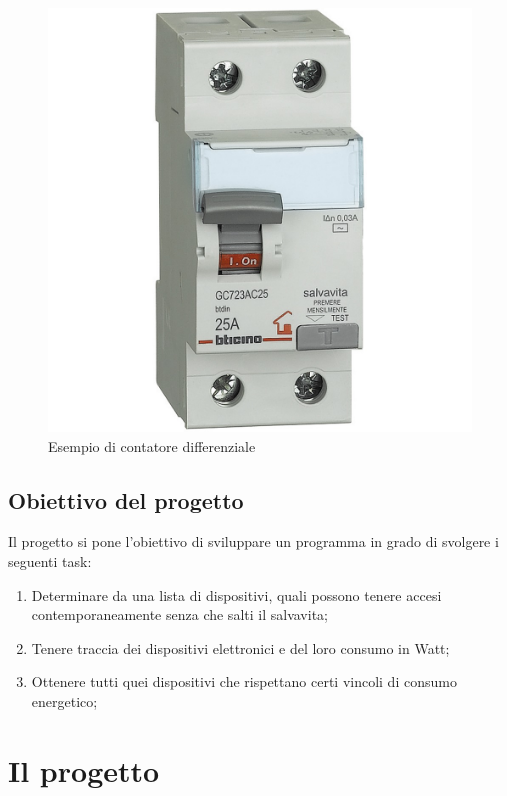 \documentclass[12pt, letterpaper]{article}
\begin{document}
\begin{figure}[h]
      \centering
      \includegraphics[scale=0.2]{interruttore-diff.jpg}
      \caption{Esempio di contatore differenziale}
\end{figure}


\subsection{Obiettivo del progetto}

Il progetto si pone l'obiettivo di sviluppare un programma in grado di svolgere
i seguenti task:

\begin{enumerate}
      \item Determinare da una lista di dispositivi, quali possono tenere accesi contemporaneamente
            senza che salti il salvavita;
      \item Tenere traccia dei dispositivi elettronici e del loro consumo in Watt;
      \item Ottenere tutti quei dispositivi che rispettano certi vincoli di consumo energetico;
\end{enumerate}

\newpage

\section{Il progetto}
\end{document}
